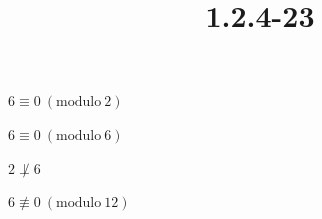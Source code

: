 \documentclass{article}
\title{1.2.4-23}
\begin{document}
\maketitle

$6 \equiv 0\ (\mathrm{modulo}\ 2)$

$6 \equiv 0\ (\mathrm{modulo}\ 6)$

$2 \not\perp 6$

$6 \not\equiv 0\ (\mathrm{modulo}\ 12)$
\end{document}
